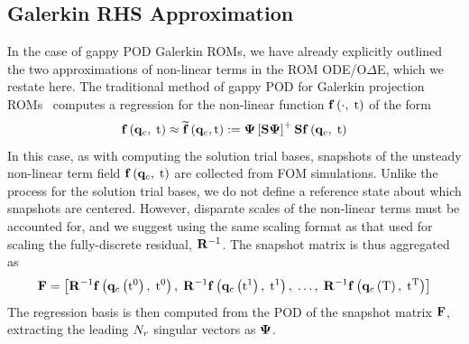 \subsection{Galerkin RHS Approximation}
%
In the case of gappy POD Galerkin ROMs, we have already explicitly outlined the two approximations of non-linear terms in the ROM ODE/O$\Delta$E, which we restate here. The traditional method of gappy POD for Galerkin projection ROMs~\cite{Chaturantabut2010} computes a regression for the non-linear function $\mathbf{f} \left(\cdot, \; \text{t}\right)$ of the form
%
\begin{equation}
	\rhsFunc{\consVec, \; \timeVar} \approx \rhsApproxFunc{\consVec, \timeVar} \defEq \deimBasis \left[\sampMat \deimBasis \right]^+ \sampMat \rhsFunc{\consVec, \; \timeVar}
\end{equation}
%
In this case, as with computing the solution trial bases, snapshots of the unsteady non-linear term field $\mathbf{f} \left(\mathbf{q}_{c}, \; \text{t}\right)$ are collected from FOM simulations. Unlike the process for the solution trial bases, we do not define a reference state about which snapshots are centered. However, disparate scales of the non-linear terms must be accounted for, and we suggest using the same scaling format as that used for scaling the fully-discrete residual, $\resScaleInv$. The snapshot matrix is thus aggregated as
%
\begin{equation}
	\rhsDataMat = \left[ \resScaleInv \rhsFunc{\consFunc{\timeVar^0}, \; \timeVar^0}, \; \resScaleInv \rhsFunc{\consFunc{\timeVar^1}, \; \timeVar^1}, \; \hdots, \; \resScaleInv \rhsFunc{\consFunc{\finalTime}, \; \timeVar^{\finalTime}} \right]
\end{equation}
%
The regression basis is then computed from the POD of the snapshot matrix $\rhsDataMat$, extracting the leading $N_r$ singular vectors as $\deimBasis$.

